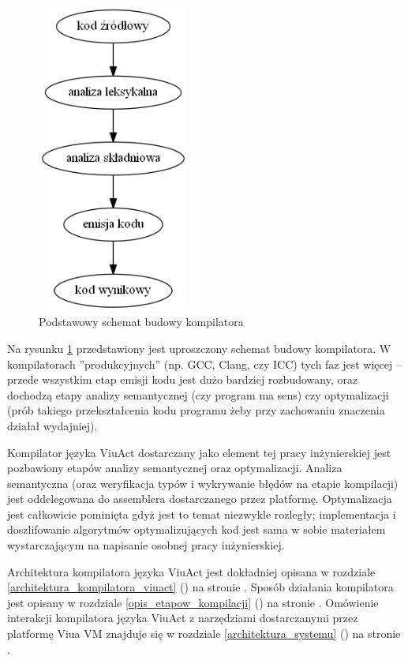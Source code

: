 \documentclass[11pt,oneside,a4paper,titlepage,onecolumn]{article}
\begin{document}
\begin{figure}[!htp]
    \centering
    \includegraphics[width=5cm]{basic-compiler-flow}
    \caption{Podstawowy schemat budowy kompilatora}
    \label{basic_compiler_flow}
\end{figure}

Na rysunku \ref{basic_compiler_flow} przedstawiony jest uproszczony schemat budowy kompilatora.
W kompilatorach ''produkcyjnych'' (np. GCC, Clang, czy ICC) tych faz jest więcej -- przede wszystkim etap
emisji kodu jest dużo bardziej rozbudowany, oraz dochodzą etapy analizy semantycznej (czy program ma sens) czy
optymalizacji (prób takiego przekształcenia kodu programu żeby przy zachowaniu znaczenia działał wydajniej).

Kompilator języka ViuAct dostarczany jako element tej pracy inżynierskiej jest pozbawiony etapów
analizy semantycznej oraz optymalizacji. Analiza semantyczna (oraz weryfikacja typów i wykrywanie błędów na
etapie kompilacji) jest oddelegowana do assemblera dostarczanego przez platformę. Optymalizacja jest
całkowicie pominięta gdyż jest to temat niezwykle rozległy; implementacja i doszlifowanie algorytmów
optymalizujących kod jest sama w sobie materiałem wystarczającym na napisanie osobnej pracy inżynierskiej.

Architektura kompilatora języka ViuAct jest dokładniej opisana w rozdziale
\ref{architektura_kompilatora_viuact} () na
stronie \pageref{architektura_kompilatora_viuact}.
Sposób działania kompilatora jest opisany w rozdziale \ref{opis_etapow_kompilacji}
() na stronie \pageref{opis_etapow_kompilacji}.
Omówienie interakcji kompilatora języka ViuAct z narzędziami dostarczanymi przez platformę Viua VM znajduje
się w rozdziale \ref{architektura_systemu} () na stronie
\pageref{architektura_systemu}.
\end{document}
